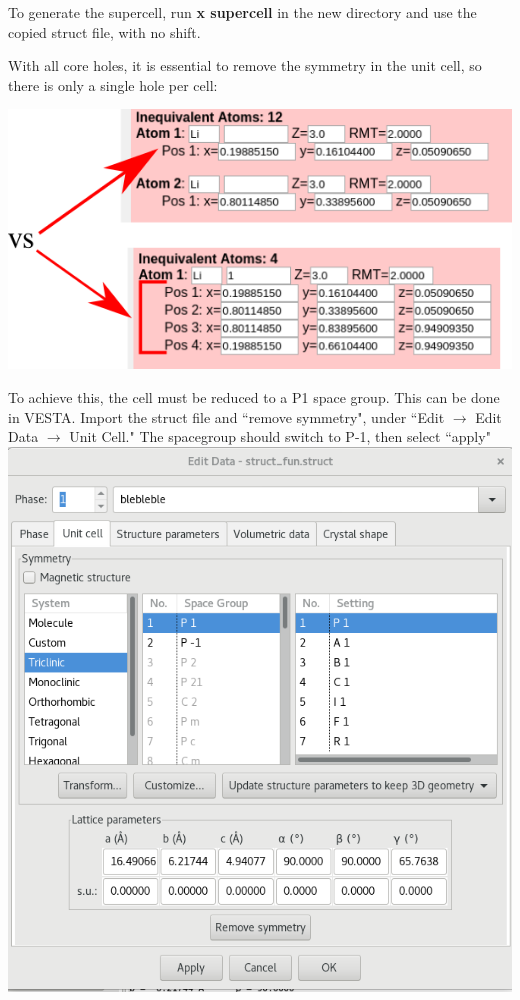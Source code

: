 \documentclass[12pt]{article}
\begin{document}
To generate the supercell, run \textbf{x supercell} in the new directory and use the copied struct file, with no shift. 

With all core holes, it is essential to remove the symmetry in the unit cell, so there is only a single hole per cell: 

\includegraphics[scale=0.5]{./images/isolated_struct.png}

To achieve this, the cell must be reduced to a P1 space group.  This can be done in VESTA.  Import the struct file and ``remove symmetry", under ``Edit $\to$  Edit Data $\to$ Unit Cell." The spacegroup should switch to P-1, then select ``apply" \\

\includegraphics[scale=0.3]{./images/vesta_struct_edit.png}\\
\end{document}
